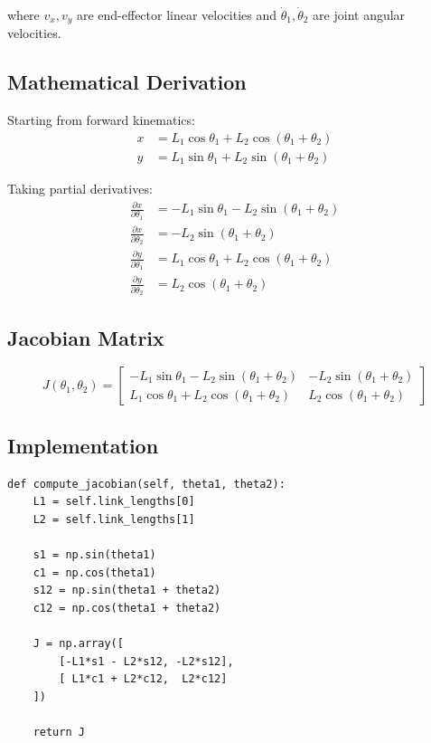\documentclass[11pt,a4paper]{article}
\begin{document}
where $v_x, v_y$ are end-effector linear velocities and $\dot{\theta}_1, \dot{\theta}_2$ are joint angular velocities.

\subsection{Mathematical Derivation}

Starting from forward kinematics:
\begin{align}
x &= L_1 \cos\theta_1 + L_2 \cos(\theta_1 + \theta_2) \\
y &= L_1 \sin\theta_1 + L_2 \sin(\theta_1 + \theta_2)
\end{align}

Taking partial derivatives:
\begin{align}
\frac{\partial x}{\partial \theta_1} &= -L_1 \sin\theta_1 - L_2 \sin(\theta_1 + \theta_2) \\
\frac{\partial x}{\partial \theta_2} &= -L_2 \sin(\theta_1 + \theta_2) \\
\frac{\partial y}{\partial \theta_1} &= L_1 \cos\theta_1 + L_2 \cos(\theta_1 + \theta_2) \\
\frac{\partial y}{\partial \theta_2} &= L_2 \cos(\theta_1 + \theta_2)
\end{align}

\subsection{Jacobian Matrix}

\begin{equation}
J(\theta_1, \theta_2) = \begin{bmatrix}
-L_1 \sin\theta_1 - L_2 \sin(\theta_1+\theta_2) & -L_2 \sin(\theta_1+\theta_2) \\
L_1 \cos\theta_1 + L_2 \cos(\theta_1+\theta_2) & L_2 \cos(\theta_1+\theta_2)
\end{bmatrix}
\end{equation}

\subsection{Implementation}

\begin{lstlisting}
def compute_jacobian(self, theta1, theta2):
    L1 = self.link_lengths[0]
    L2 = self.link_lengths[1]
    
    s1 = np.sin(theta1)
    c1 = np.cos(theta1)
    s12 = np.sin(theta1 + theta2)
    c12 = np.cos(theta1 + theta2)
    
    J = np.array([
        [-L1*s1 - L2*s12, -L2*s12],
        [ L1*c1 + L2*c12,  L2*c12]
    ])
    
    return J
\end{lstlisting}
\end{document}
